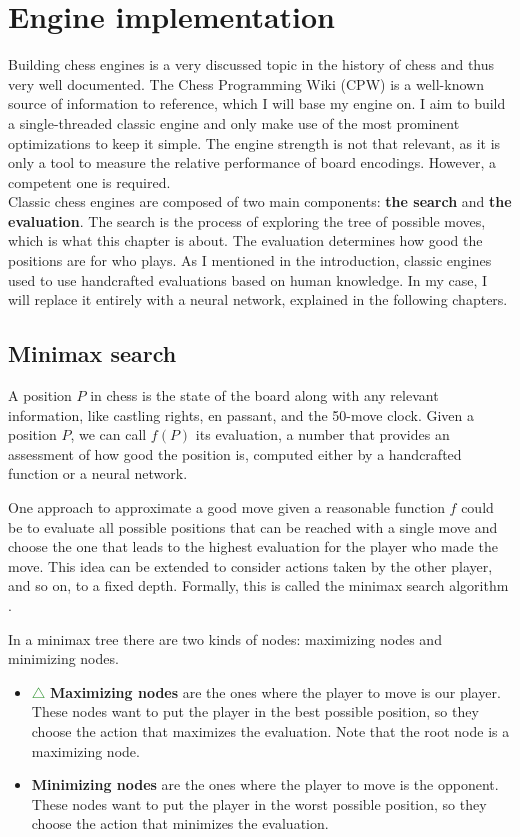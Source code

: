 \section{Engine implementation}

Building chess engines is a very discussed topic in the history of chess and thus very well documented. The Chess Programming Wiki (CPW) \cite{cpw} is a well-known source of information to reference, which I will base my engine on. I aim to build a single-threaded classic engine and only make use of the most prominent optimizations to keep it simple. The engine strength is not that relevant, as it is only a tool to measure the relative performance of board encodings. However, a competent one is required. \\

Classic chess engines are composed of two main components: \textbf{the search} and \textbf{the evaluation}. The search is the process of exploring the tree of possible moves, which is what this chapter is about. The evaluation determines how good the positions are for who plays. As I mentioned in the introduction, classic engines used to use handcrafted evaluations based on human knowledge. In my case, I will replace it entirely with a neural network, explained in the following chapters.

\subsection{Minimax search}

A position $P$ in chess is the state of the board along with any relevant information, like castling rights, en passant, and the 50-move clock. Given a position $P$, we can call $f(P)$ its evaluation, a number that provides an assessment of how good the position is, computed either by a handcrafted function or a neural network.

One approach to approximate a good move given a reasonable function $f$ could be to evaluate all possible positions that can be reached with a single move and choose the one that leads to the highest evaluation for the player who made the move. This idea can be extended to consider actions taken by the other player, and so on, to a fixed depth. Formally, this is called the minimax search algorithm \cite{minimax-survey:1995}.

In a minimax tree there are two kinds of nodes: maximizing nodes and minimizing nodes. 

\begin{itemize}
\item \textcolor{ForestGreen}{$\triangle$} \textbf{Maximizing nodes} are the ones where the player to move is our player. These nodes want to put the player in the best possible position, so they choose the action that maximizes the evaluation. Note that the root node is a maximizing node.
\item \textcolor{red}{} \textbf{Minimizing nodes} are the ones where the player to move is the opponent. These nodes want to put the player in the worst possible position, so they choose the action that minimizes the evaluation.
\end{itemize}


